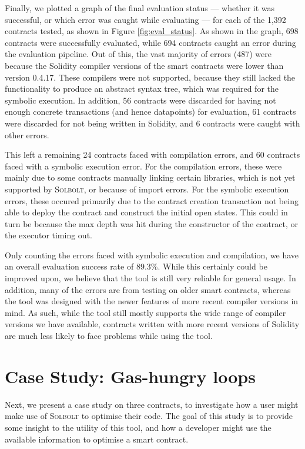 Finally, we plotted a graph of the final evaluation status --- whether it was
successful, or which error was caught while evaluating --- for each of the 1,392
contracts tested, as shown in Figure \ref{fig:eval_status}. As shown in the graph,
698 contracts were successfully evaluated, while 694 contracts caught an error 
during the evaluation pipeline. Out of this, the vast majority of errors (487) were because
the Solidity compiler versions of the smart contracts were lower than version 0.4.17. These compilers were not
supported, because they still lacked the functionality to 
produce an abstract syntax tree, which was required for the symbolic execution. In addition, 
56 contracts were discarded for having not enough concrete transactions (and hence datapoints) 
for evaluation, 61 contracts were discarded for not being written in Solidity, and 6 contracts
were caught with other errors. 

This left a remaining 24 contracts faced with compilation errors,
and 60 contracts faced with a symbolic execution error. For the compilation errors,
these were mainly due to some contracts manually linking certain libraries, which is
not yet supported by \textcolor{NavyBlue}{\textsc{Solbolt}}, or because of import errors. For the symbolic execution errors,
these occured primarily due to the contract creation transaction not being able to
deploy the contract and construct the initial open states. This could in turn be because
the max depth was hit during the constructor of the contract, or the executor timing out.

Only counting the errors faced with symbolic execution and compilation, we have an overall
evaluation success rate of 89.3\%. While this certainly could be improved upon, we believe
that the tool is still very reliable for general usage. In addition, many of the errors
are from testing on older smart contracts, whereas the tool was designed with the newer features
of more recent compiler versions in mind. As such, while the tool still mostly supports 
the wide range of compiler versions we have available, contracts written with more recent 
versions of Solidity are much less likely to face problems while using the tool.

\section{Case Study: Gas-hungry loops}
\label{section:gas_hungry_loop}

Next, we present a case study on three contracts, to investigate how 
a user might make use of \textcolor{NavyBlue}{\textsc{Solbolt}} to optimise their code. The goal of this
study is to provide some insight to the utility of this tool, and how a
developer might use the available information to optimise a smart contract.

